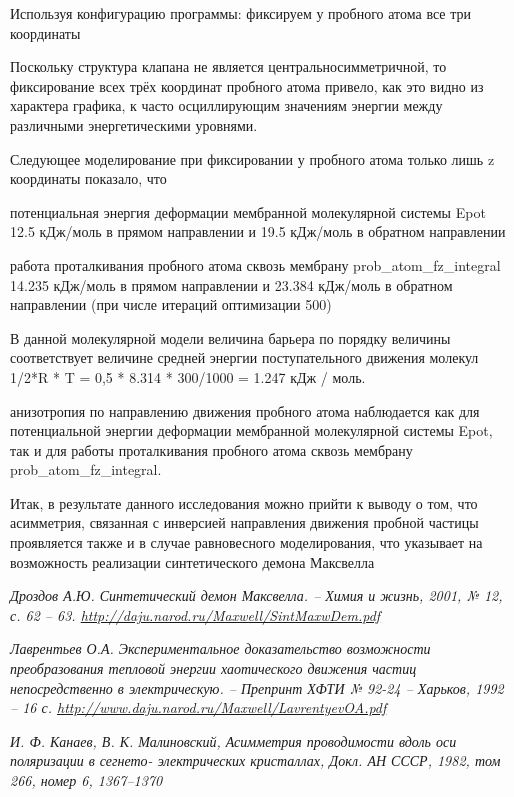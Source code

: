 \documentclass[12pt]{article}
\begin{document}
Используя конфигурацию программы:  фиксируем у пробного атома все три координаты






Поскольку структура клапана не является центральносимметричной, то фиксирование всех трёх координат пробного атома привело, как это видно из характера графика, к часто осциллирующим значениям энергии между различными энергетическими уровнями. 

Следующее моделирование при фиксировании у пробного атома только лишь z координаты показало, что 

потенциальная энергия деформации мембранной молекулярной системы Epot 12.5 кДж/моль в прямом направлении и 19.5 кДж/моль в обратном направлении

работа проталкивания пробного атома сквозь мембрану prob\_atom\_fz\_integral 14.235 кДж/моль в прямом направлении и 23.384 кДж/моль в обратном направлении (при числе итераций оптимизации 500)

В данной молекулярной модели величина барьера по порядку величины соответствует величине средней энергии поступательного движения молекул 1/2*R * T = 0,5 * 8.314 * 300/1000 = 1.247 кДж / моль.


анизотропия по направлению движения пробного атома наблюдается как для потенциальной энергии деформации мембранной молекулярной системы Epot, так и для работы проталкивания пробного атома сквозь мембрану prob\_atom\_fz\_integral. 

Итак, в результате данного исследования можно прийти к выводу о том, что асимметрия, связанная с инверсией направления движения пробной частицы проявляется также и в случае равновесного моделирования, что указывает на возможность реализации синтетического демона Максвелла


\begin{thebibliography}{99}

\textit{ Дроздов А.Ю. Синтетический демон Максвелла. – Химия и жизнь, 2001, № 12, с. 62 – 63. \url{http://daju.narod.ru/Maxwell/SintMaxwDem.pdf} }

\textit{ Лаврентьев О.А. Экспериментальное доказательство возможности преобразования тепловой энергии хаотического движения частиц непосредственно в электрическую. – Препринт ХФТИ № 92-24 – Харьков, 1992 – 16 с. \url{http://www.daju.narod.ru/Maxwell/LavrentyevOA.pdf} }

\textit{И. Ф. Канаев, В. К. Малиновский, Асимметрия
проводимости вдоль оси поляризации в сегнето-
электрических кристаллах, Докл. АН СССР, 1982,
том 266, номер 6, 1367–1370}

\end{thebibliography}
\end{document}
